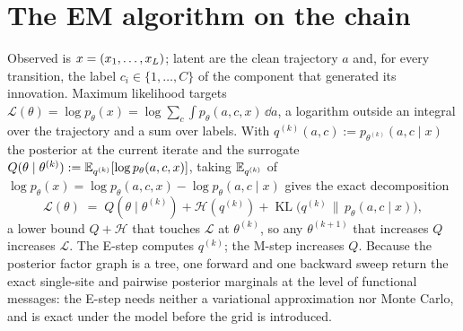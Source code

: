 \section{The EM algorithm on the chain}\label{sec:em-algorithm}

Observed is $x = (x_1,\dots,x_L)$; latent are the clean trajectory $a$
and, for every transition, the label $c_i \in \{1,\dots,C\}$ of the component
that generated its innovation. Maximum likelihood targets
$\mathcal L(\theta) = \log p_\theta(x) = \log\sum_c\int p_\theta(a,c,x)\,\dd a$,
a logarithm outside an integral over the trajectory and a sum over labels.
With $q^{(k)}(a,c) := p_{\theta^{(k)}}(a,c\mid x)$ the posterior at the
current iterate and the surrogate
$Q(\theta\mid\theta^{(k)}) := \mathbb{E}_{q^{(k)}}[\log p_\theta(a,c,x)]$, taking
$\mathbb{E}_{q^{(k)}}$ of $\log p_\theta(x) = \log p_\theta(a,c,x) - \log p_\theta(a,c\mid x)$
gives the exact decomposition
\begin{equation}
  \mathcal L(\theta)
  \;=\;
  Q(\theta\mid\theta^{(k)}) + \mathcal H(q^{(k)})
  + \operatorname{KL}\!\big( q^{(k)} \,\big\|\, p_\theta(a,c\mid x) \big),
  \label{eq:em-decomposition}
\end{equation}
a lower bound $Q + \mathcal H$ that touches $\mathcal L$ at $\theta^{(k)}$,
so any $\theta^{(k+1)}$ that increases $Q$ increases $\mathcal L$. The E-step
computes $q^{(k)}$; the M-step increases $Q$. Because the posterior factor
graph is a tree, one forward and one backward sweep return the exact
single-site and pairwise posterior marginals at the level of functional
messages: the E-step needs neither a variational approximation nor Monte
Carlo, and is exact under the model before the grid is introduced.

